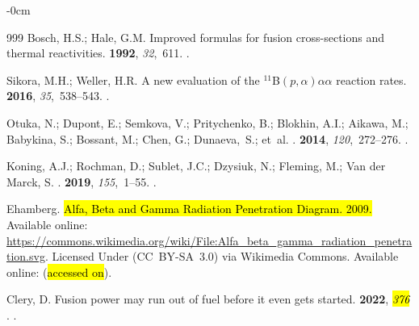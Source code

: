 \documentclass[particles,article,accept,pdftex,moreauthors]{Definitions/mdpi}
\begin{document}
\begin{adjustwidth}{-\extralength}{0cm}
\begin{thebibliography}{999}
Bosch, H.S.; Hale, G.M.
\newblock Improved formulas for fusion cross-sections and thermal reactivities.
 {\bf 1992}, {\em 32},~611.
.

Sikora, M.H.; Weller, H.R.
\newblock A new evaluation of the ${}^{11}$B$(p,\alpha)\alpha\alpha$ reaction
  rates.
 {\bf 2016}, {\em 35},~538--543.
.

Otuka, N.; Dupont, E.;  Semkova, V.; Pritychenko, B.; Blokhin, A.I.; Aikawa, M.; Babykina, S.; Bossant, M.; Chen, G.; Dunaeva,~S.; et~al.
.
 {\bf 2014}, {\em 120},~272--276.
.

Koning, A.J.; Rochman, D.;  Sublet, J.C.; Dzysiuk, N.; Fleming, M.; Van der Marck, S.
.
 {\bf 2019}, {\em 155},~1--55.
.

{Ehamberg}.
\newblock \hl{Alfa, Beta and Gamma Radiation Penetration Diagram. 2009.} %
\newblock
Available online:  \url{https://commons.wikimedia.org/wiki/File:Alfa_beta_gamma_radiation_penetration.svg}.
\newblock Licensed Under (CC~BY-SA~3.0) via  Wikimedia Commons.
Available online:  %
 (\hl{accessed on}).



Clery, D.
\newblock Fusion power may run out of fuel before it even gets started.
 {\bf 2022}, {\em \hl{376}%
}.
.



\end{thebibliography}
\end{adjustwidth}
\end{document}
